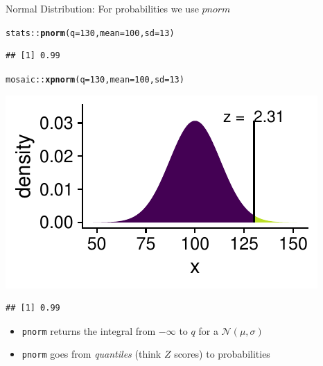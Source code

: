 \documentclass[10pt,handout]{beamer}\usepackage[]{graphicx}\usepackage[]{color}
\makeatletter
\newcommand{\hlnum}[1]{\textcolor[rgb]{0.686,0.059,0.569}{#1}}%
\newcommand{\hlopt}[1]{\textcolor[rgb]{0,0,0}{#1}}%
\newcommand{\hlstd}[1]{\textcolor[rgb]{0.345,0.345,0.345}{#1}}%
\newcommand{\hlkwc}[1]{\textcolor[rgb]{0.333,0.667,0.333}{#1}}%
\newcommand{\hlkwd}[1]{\textcolor[rgb]{0.737,0.353,0.396}{\textbf{#1}}}%
\newenvironment{kframe}{%
 \def\at@end@of@kframe{}%
 \ifinner\ifhmode%
  \def\at@end@of@kframe{\end{minipage}}%
  \begin{minipage}{\columnwidth}%
 \fi\fi%
 \def\FrameCommand##1{\hskip\@totalleftmargin \hskip-\fboxsep
 \colorbox{shadecolor}{##1}\hskip-\fboxsep
     \hskip-\linewidth \hskip-\@totalleftmargin \hskip\columnwidth}%
 \MakeFramed {\advance\hsize-\width
   \@totalleftmargin\z@ \linewidth\hsize
   \@setminipage}}%
 {\par\unskip\endMakeFramed%
 \at@end@of@kframe}
\newenvironment{knitrout}{}{} %
\makeatother
\begin{document}
\begin{frame}[fragile]{Normal Distribution: For probabilities we use $pnorm$}
	
	
\begin{knitrout}\tiny
{}\color{fgcolor}\begin{kframe}
\begin{alltt}
\hlstd{stats}\hlopt{::}\hlkwd{pnorm}\hlstd{(}\hlkwc{q} \hlstd{=} \hlnum{130}\hlstd{,} \hlkwc{mean} \hlstd{=} \hlnum{100}\hlstd{,} \hlkwc{sd} \hlstd{=} \hlnum{13}\hlstd{)}
\end{alltt}
\begin{verbatim}
## [1] 0.99
\end{verbatim}
\end{kframe}
\end{knitrout}
	
	
\begin{knitrout}\tiny
{}\color{fgcolor}\begin{kframe}
\begin{alltt}
\hlstd{mosaic}\hlopt{::}\hlkwd{xpnorm}\hlstd{(}\hlkwc{q} \hlstd{=} \hlnum{130}\hlstd{,} \hlkwc{mean} \hlstd{=} \hlnum{100}\hlstd{,} \hlkwc{sd} \hlstd{=} \hlnum{13}\hlstd{)}
\end{alltt}
\end{kframe}

{\centering \includegraphics[width=0.6\linewidth]{figure/probs3-1} 

}


\begin{kframe}\begin{verbatim}
## [1] 0.99
\end{verbatim}
\end{kframe}
\end{knitrout}
	
	
	\begin{itemize}
		\item \texttt{pnorm} returns the integral from $-\infty$ to $q$ for a $\mathcal{N}(\mu, \sigma)$
		\item \texttt{pnorm} goes from \textit{quantiles} (think $Z$ scores) to probabilities
	\end{itemize}
	
\end{frame}
\end{document}
